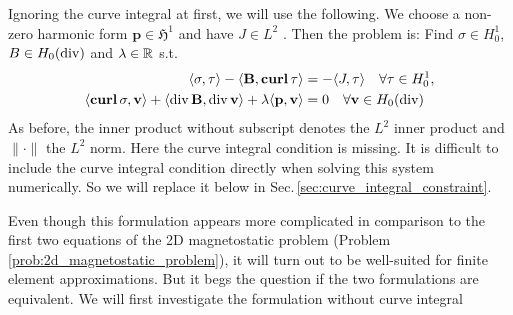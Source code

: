 \documentclass[../master_thesis.tex]{subfiles}
\begin{document}
Ignoring the curve integral 
at first, we will use the following. We choose a non-zero harmonic form 
$\mathbf{p} \in \mathfrak{H}^1$ and have 
$J \in L^2$ . Then the problem is: Find $\sigma \in H^1_0$, 
$B \in H_0(\operatorname{div})$ and $\lambda \in \mathbb{R}$ s.t.
\begin{align}
    \langle \sigma, \tau \rangle - \langle \mathbf{B}, \veccurl \tau \rangle 
        &=  -\langle J, \tau \rangle \quad \forall \tau \in H^1_0, \label{eq:first_eq_mixed_formulation}
    \\ \langle \veccurl\sigma, \mathbf{v} \rangle + \langle \diver \mathbf{B}, \diver \mathbf{v} \rangle 
        + \lambda \langle \mathbf{p}, \mathbf{v} \rangle 
        &= 0 \quad \forall \mathbf{v} \in H_0(\diver) \label{eq:second_eq_mixed_formulation}
\end{align} 
As before, the inner product without subscript denotes the $L^2$ inner product and 
$\lVert \cdot \rVert$ the $L^2$ norm.
Here the curve integral condition is missing. It is difficult to include the curve integral 
condition directly when solving this system numerically. So we will replace it below 
in Sec.\,\ref{sec:curve_integral_constraint}.

Even though this formulation appears more complicated in comparison to the first two equations of 
the 2D magnetostatic problem (Problem\,\ref{prob:2d_magnetostatic_problem}), 
it will turn out to be well-suited for finite element approximations.
But it begs the question if the two formulations are equivalent. We will first 
investigate the formulation without curve integral
\end{document}
